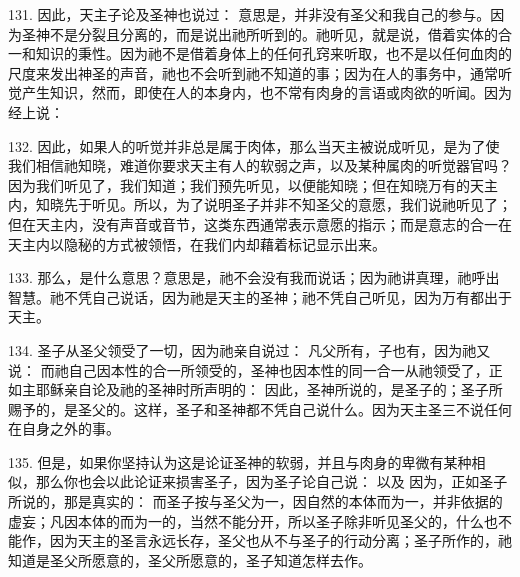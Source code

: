131. 因此，天主子论及圣神也说过： 意思是，并非没有圣父和我自己的参与。因为圣神不是分裂且分离的，而是说出祂所听到的。祂听见，就是说，借着实体的合一和知识的秉性。因为祂不是借着身体上的任何孔窍来听取，也不是以任何血肉的尺度来发出神圣的声音，祂也不会听到祂不知道的事；因为在人的事务中，通常听觉产生知识，然而，即使在人的本身内，也不常有肉身的言语或肉欲的听闻。因为经上说：\par

132. 因此，如果人的听觉并非总是属于肉体，那么当天主被说成听见，是为了使我们相信祂知晓，难道你要求天主有人的软弱之声，以及某种属肉的听觉器官吗？因为我们听见了，我们知道；我们预先听见，以便能知晓；但在知晓万有的天主内，知晓先于听见。所以，为了说明圣子并非不知圣父的意愿，我们说祂听见了；但在天主内，没有声音或音节，这类东西通常表示意愿的指示；而是意志的合一在天主内以隐秘的方式被领悟，在我们内却藉着标记显示出来。\par

133. 那么，是什么意思？意思是，祂不会没有我而说话；因为祂讲真理，祂呼出智慧。祂不凭自己说话，因为祂是天主的圣神；祂不凭自己听见，因为万有都出于天主。\par

134. 圣子从圣父领受了一切，因为祂亲自说过： 凡父所有，子也有，因为祂又说： 而祂自己因本性的合一所领受的，圣神也因本性的同一合一从祂领受了，正如主耶稣亲自论及祂的圣神时所声明的： 因此，圣神所说的，是圣子的；圣子所赐予的，是圣父的。这样，圣子和圣神都不凭自己说什么。因为天主圣三不说任何在自身之外的事。\par

135. 但是，如果你坚持认为这是论证圣神的软弱，并且与肉身的卑微有某种相似，那么你也会以此论证来损害圣子，因为圣子论自己说： 以及  因为，正如圣子所说的，那是真实的： 而圣子按与圣父为一，因自然的本体而为一，并非依据的虚妄；凡因本体的而为一的，当然不能分开，所以圣子除非听见圣父的，什么也不能作，因为天主的圣言永远长存，圣父也从不与圣子的行动分离；圣子所作的，祂知道是圣父所愿意的，圣父所愿意的，圣子知道怎样去作。\par

